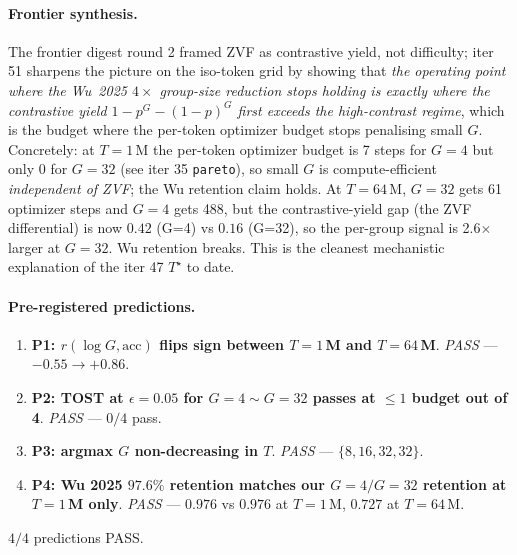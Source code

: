 \paragraph{Frontier synthesis.}
The frontier digest round 2 framed ZVF as contrastive yield, not
difficulty; iter 51 sharpens the picture on the iso-token grid by
showing that \emph{the operating point where the Wu~2025 $4\times$
group-size reduction stops holding is exactly where the contrastive
yield $1 - p^G - (1-p)^G$ first exceeds the high-contrast regime},
which is the budget where the per-token optimizer budget stops
penalising small $G$.  Concretely: at $T{=}1$\,M the per-token
optimizer budget is 7 steps for $G{=}4$ but only 0 for $G{=}32$
(see iter 35 \texttt{pareto}), so small $G$ is compute-efficient
\emph{independent of ZVF}; the Wu retention claim holds.
At $T{=}64$\,M, $G{=}32$ gets 61 optimizer steps and $G{=}4$ gets
488, but the contrastive-yield gap (the ZVF differential) is now
$0.42$ (G=4) vs $0.16$ (G=32), so the per-group signal is 2.6$\times$
larger at $G{=}32$.  Wu retention breaks.  This is the cleanest
mechanistic explanation of the iter 47 $T^\star$ to date.

\paragraph{Pre-registered predictions.}
\begin{enumerate}
  \item \textbf{P1: $r(\log G, \text{acc})$ flips sign between
        $T{=}1$\,M and $T{=}64$\,M}. \emph{PASS} --- $-0.55 \to +0.86$.
  \item \textbf{P2: TOST at $\epsilon{=}0.05$ for $G{=}4 \sim G{=}32$
        passes at $\le 1$ budget out of 4}. \emph{PASS} --- $0/4$
        pass.
  \item \textbf{P3: argmax $G$ non-decreasing in $T$}. \emph{PASS}
        --- $\{8, 16, 32, 32\}$.
  \item \textbf{P4: Wu 2025 $97.6\%$ retention matches our
        $G{=}4/G{=}32$ retention at $T{=}1$\,M only}. \emph{PASS} ---
        $0.976$ vs $0.976$ at $T{=}1$\,M, $0.727$ at $T{=}64$\,M.
\end{enumerate}
$4/4$ predictions PASS.
